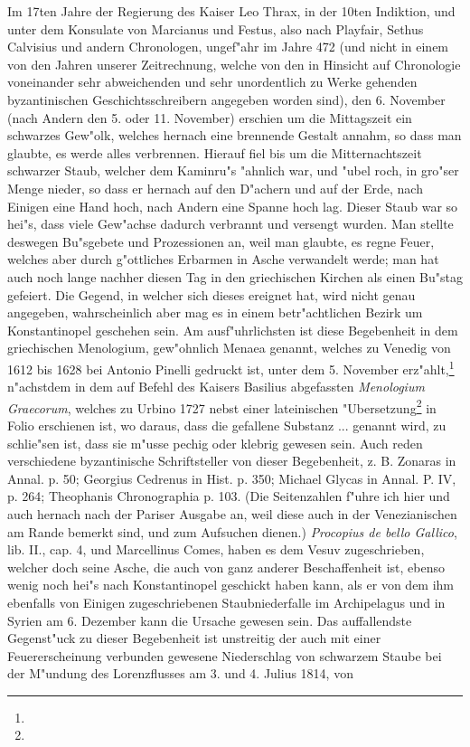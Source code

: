 \documentclass[a4paper, 11pt, oneside, polutonikogreek, german]{article}
\begin{document}
Im 17ten Jahre der Regierung des Kaiser Leo Thrax, in der 10ten Indiktion, und unter dem Konsulate von Marcianus und Festus, also nach Playfair, Sethus Calvisius und andern Chronologen, ungef"ahr im Jahre 472 (und nicht in einem von den Jahren unserer Zeitrechnung, welche von den in Hinsicht auf Chronologie voneinander sehr abweichenden und sehr unordentlich zu Werke gehenden byzantinischen Geschichtsschreibern angegeben worden sind), den 6. November (nach Andern den 5. oder 11. November) erschien um die Mittagszeit ein schwarzes Gew"olk, welches hernach eine brennende Gestalt annahm, so dass man glaubte, es werde alles verbrennen. Hierauf fiel bis um die Mitternachtszeit schwarzer Staub, welcher dem Kaminru"s "ahnlich war, und "ubel roch, in gro"ser Menge nieder, so dass er hernach auf den D"achern und auf der Erde, nach Einigen eine Hand hoch, nach Andern eine Spanne hoch lag. Dieser Staub war so hei"s, dass viele Gew"achse dadurch verbrannt und versengt wurden. Man stellte deswegen Bu"sgebete und Prozessionen an, weil man glaubte, es regne Feuer, welches aber durch g"ottliches Erbarmen in Asche verwandelt werde; man hat auch noch lange nachher diesen Tag in den griechischen Kirchen als einen Bu"stag gefeiert. Die Gegend, in welcher sich dieses ereignet hat, wird nicht genau angegeben, wahrscheinlich aber mag es in einem betr"achtlichen Bezirk um Konstantinopel geschehen sein. Am ausf"uhrlichsten ist diese Begebenheit in dem griechischen Menologium, gew"ohnlich Menaea genannt, welches zu Venedig von 1612 bis 1628 bei Antonio Pinelli gedruckt ist, unter dem 5. November erz"ahlt,\footnote{} n"achstdem in dem auf Befehl des Kaisers Basilius abgefassten \emph{Menologium Graecorum}, welches zu Urbino 1727 nebst einer lateinischen "Ubersetzung\footnote{} in Folio erschienen ist, wo daraus, dass die gefallene Substanz ... genannt wird, zu schlie"sen ist, dass sie m"usse pechig oder klebrig gewesen sein. Auch reden verschiedene byzantinische Schriftsteller von dieser Begebenheit, z. B. Zonaras in Annal. p. 50; Georgius Cedrenus in Hist. p. 350; Michael Glycas in Annal. P. IV, p. 264; Theophanis Chronographia p. 103. (Die Seitenzahlen f"uhre ich hier und auch hernach nach der Pariser Ausgabe an, weil diese auch in der Venezianischen am Rande bemerkt sind, und zum Aufsuchen dienen.) \emph{Procopius de bello Gallico}, lib. II., cap. 4, und Marcellinus Comes, haben es dem Vesuv zugeschrieben, welcher doch seine Asche, die auch von ganz anderer Beschaffenheit ist, ebenso wenig noch hei"s nach Konstantinopel geschickt haben kann, als er von dem ihm ebenfalls von Einigen zugeschriebenen Staubniederfalle im Archipelagus und in Syrien am 6. Dezember kann die Ursache gewesen sein. Das auffallendste Gegenst"uck zu dieser Begebenheit ist unstreitig der auch mit einer Feuererscheinung verbunden gewesene Niederschlag von schwarzem Staube bei der M"undung des Lorenzflusses am 3. und 4. Julius 1814, von 
\end{document}
